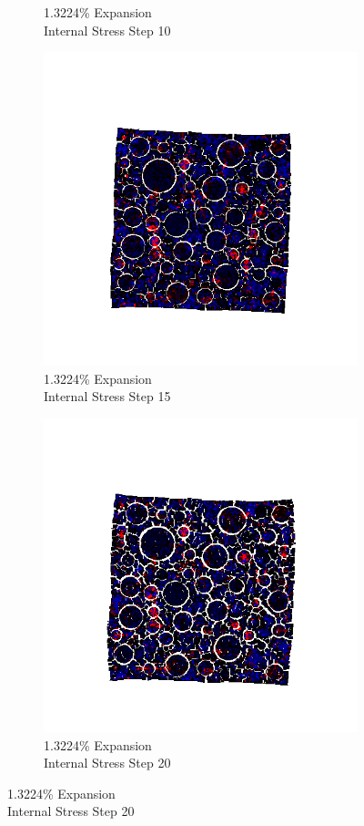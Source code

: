 \begin{figure}[ht!]
\begin{subfigure}{.25\textwidth}
      \caption{1.3224\% Expansion\\Internal Stress Step 10}
    \end{subfigure}%
    \begin{subfigure}{.25\textwidth}
      \centering
      \includegraphics[width=1.0\linewidth]{Files/exp_3D/ASR/A30P75_5_s15.png}
      \caption{1.3224\% Expansion\\Internal Stress Step 15}
    \end{subfigure}%
    \begin{subfigure}{.25\textwidth}
      \centering
      \includegraphics[width=1.0\linewidth]{Files/exp_3D/ASR/A30P75_5_stress.png}
      \caption{1.3224\% Expansion\\Internal Stress Step 20}
    \end{subfigure}


\end{figure}
